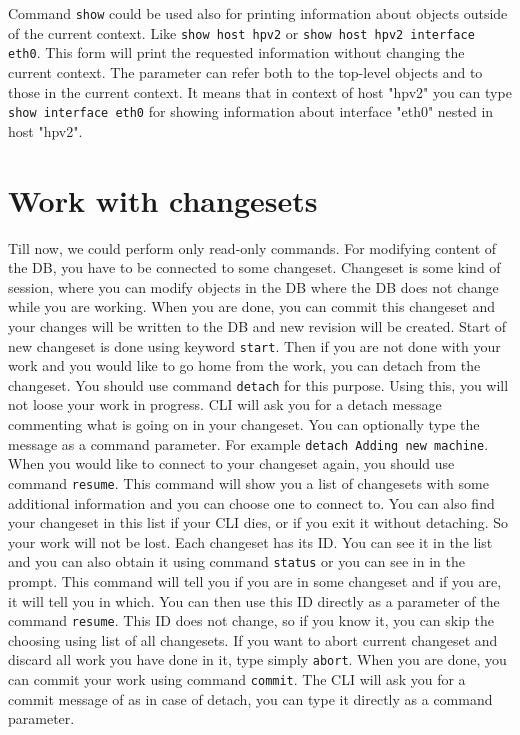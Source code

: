 \documentclass[deska]{subfiles}
\begin{document}
Command {\tt show} could be used also for printing information about objects outside of the current context. Like {\tt show host hpv2} or
{\tt show host hpv2 interface eth0}. This form will print the requested information without changing the current context.
The parameter can refer both to the top-level objects and to those in the current context. It means that in context of host "hpv2" you can
type {\tt show interface eth0} for showing information about interface "eth0" nested in host "hpv2".

\section{Work with changesets}

Till now, we could perform only read-only commands. For modifying content of the DB, you have to be connected to some changeset.
Changeset is some kind of session, where you can modify objects in the DB where the DB does not change while you are working.
When you are done, you can commit this changeset and your changes will be written to the DB and new revision will be created.
Start of new changeset is done using keyword {\tt start}. Then if you are not done with your work and you would like to
go home from the work, you can detach from the changeset. You should use command {\tt detach} for this purpose. Using
this, you will not loose your work in progress. CLI will ask you for a detach message commenting what is going on in
your changeset. You can optionally type the message as a command parameter. For example {\tt detach Adding new machine}.
When you would like to connect to your changeset again, you should use command {\tt resume}. This command will show
you a list of changesets with some additional information and you can choose one to connect to. You can also find your
changeset in this list if your CLI dies, or if you exit it without detaching. So your work will not be lost. Each changeset has
its ID. You can see it in the list and you can also obtain it using command {\tt status} or you can see in in the prompt.
This command will tell you if you are in some changeset and if you are, it will tell you in which. You can then use this ID directly
as a parameter of the command {\tt resume}. This ID does not change, so if you know it, you can skip the choosing using list of
all changesets. If you want to abort current changeset and discard all work you have done in it, type simply {\tt abort}.
When you are done, you can commit your work using command {\tt commit}. The CLI will ask you for a commit message of as
in case of detach, you can type it directly as a command parameter.
\end{document}
